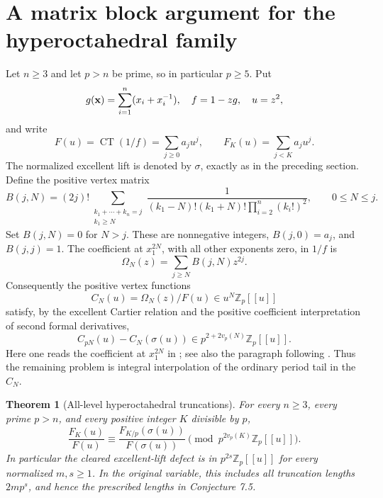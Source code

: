 \documentclass[11pt,a4paper]{article}
\newtheorem{theorem}{Theorem}[section]
\theoremstyle{definition}\newtheorem{definition}[theorem]{Definition}
\theoremstyle{remark}\newtheorem{remark}[theorem]{Remark}
\numberwithin{equation}{section}
\begin{document}
\section{A matrix block argument for the hyperoctahedral family}\label{P:source-main-3}
\label{P:sec:octa-matrix-interpolation}

Let \(n\geq3\) and let \(p>n\) be prime, so in particular
\(p\geq5\).  Put
\[
 g({\bf x})=\sum_{i=1}^n(x_i+x_i^{-1}),\quad
 f=1-zg,\quad u=z^2,
\]
and write
\[
 F(u)=\operatorname{CT}(1/f)=\sum_{j\geq0}a_ju^j,
 \qquad F_K(u)=\sum_{j<K}a_ju^j.
\]
The normalized excellent lift is denoted by \(\sigma\), exactly
as in the preceding section.  Define the positive vertex matrix
\begin{equation}\label{P:eq:octa-B}
 B(j,N)=(2j)!
 \sum_{\substack{k_1+\cdots+k_n=j\\k_1\geq N}}
 \frac1{(k_1-N)!(k_1+N)!\prod_{i=2}^n(k_i!)^2},
 \qquad 0\leq N\leq j.
\end{equation}
Set \(B(j,N)=0\) for \(N>j\).
These are nonnegative integers, \(B(j,0)=a_j\), and
\(B(j,j)=1\).  The coefficient at \(x_1^{2N}\), with all
other exponents zero, in \(1/f\) is
\[
 \Omega_N(z)=\sum_{j\geq N}B(j,N)z^{2j}.
\]
Consequently the positive vertex functions
\[
 C_N(u)=\Omega_N(z)/F(u)\in u^N\mathbb Z_p[[u]]
\]
satisfy, by the excellent Cartier relation and the positive
coefficient interpretation of second formal derivatives,
\begin{equation}\label{P:eq:octa-positive-cartier}
 C_{pN}(u)-C_N(\sigma(u))
 \in p^{2+2v_p(N)}\mathbb Z_p[[u]].
\end{equation}
Here one reads the coefficient at \(x_1^{2N}\) in
\cite[Theorem 7.3]{BV3}; see also the paragraph following
\cite[Corollary 3.4]{BV3}.  Thus the remaining problem is
integral interpolation of the ordinary period tail in the
\(C_N\).

\begin{theorem}[All-level hyperoctahedral truncations]
\label{P:thm:octa-all-levels}
For every \(n\geq3\), every prime \(p>n\), and every positive
integer \(K\) divisible by \(p\),
\[
 \frac{F_K(u)}{F(u)}
 \equiv\frac{F_{K/p}(\sigma(u))}{F(\sigma(u))}
 \pmod{p^{2v_p(K)}\mathbb Z_p[[u]]}.
\]
In particular the cleared excellent-lift defect is in
\(p^{2s}\mathbb Z_p[[u]]\) for every normalized \(m,s\geq1\).
In the original variable, this includes all truncation lengths
\(2mp^s\), and hence the prescribed lengths in Conjecture 7.5.
\end{theorem}
\end{document}
